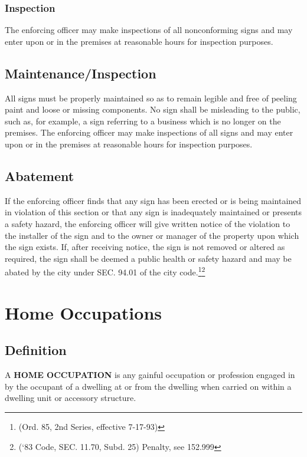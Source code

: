 \subsubsection{Inspection}
The enforcing officer may make inspections of all nonconforming signs and may enter upon or in the premises at reasonable hours for inspection purposes.
\subsection{Maintenance/Inspection}
All signs must be properly maintained so as to remain legible and free of peeling paint and loose or missing components. No sign shall be misleading to the public, such as, for example, a sign referring to a business which is no longer on the premises. The enforcing officer may make inspections of all signs and may enter upon or in the premises at reasonable hours for inspection purposes.
\subsection{Abatement}
If the enforcing officer finds that any sign has been erected or is being maintained in violation of this section or that any sign is inadequately maintained or presents a safety hazard, the enforcing officer will give written notice of the violation to the installer of the sign and to the owner or manager of the property upon which the sign exists. If, after receiving notice, the sign is not removed or altered as required, the sign shall be deemed a public health or safety hazard and may be abated by the city under SEC. 94.01 of the city code.\footnote{(Ord. 85, 2nd Series, effective 7-17-93)}\footnote{(‘83 Code, SEC. 11.70, Subd. 25)  Penalty, see 152.999}
\section{Home Occupations}
\subsection{Definition} A \textbf{HOME OCCUPATION} is any gainful occupation or profession engaged in by the occupant of a dwelling at or from the dwelling when carried on within a dwelling unit or accessory structure.
